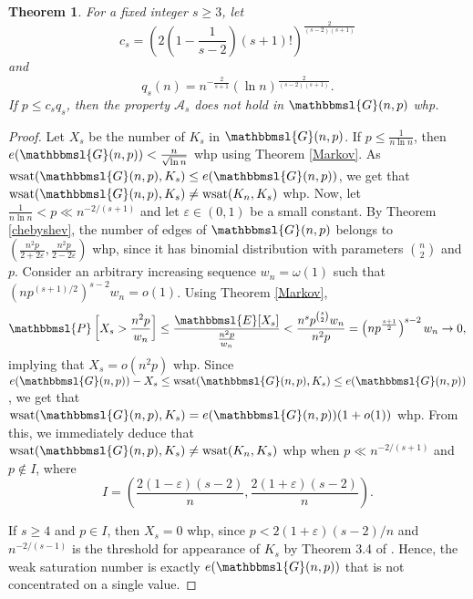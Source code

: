\documentclass[hidelinks, 11pt]{article}
\theoremstyle{plain}
\newtheorem{theorem}{Theorem}[section]
\theoremstyle{definition}
\begin{document}
\begin{theorem}\label{lower-ii}
For a  fixed integer  $s\geq 3$,  let
$$c_s=\left(2\left(1-\frac{1}{s-2}\right)(s+1)!\right)^{\frac{2}{(s-2)(s+1)}}$$  and $$q_s(n)=n^{-\frac2{s+1}}(\ln n)^\frac{2}{(s-2)(s+1)}.$$
If $p\leq c_sq_s$, then   the property   $\mathcal{A}_s$ does not hold in $\mathbbmsl{G}(n, p)$ whp.
\end{theorem}



\begin{proof}
Let $X_s$ be the number of $K_s$  in $\mathbbmsl{G}(n,p)$.
If $p\leq\frac{1}{n\ln n}$, then    $e(\mathbbmsl{G}(n, p))<\frac{n}{\sqrt{\ln n}}$  whp  using  Theorem \ref{Markov}.  As  $\mathrm{wsat}(\mathbbmsl{G}(n, p), K_s)\leq e(\mathbbmsl{G}(n, p))$, we get that $\mathrm{wsat}(\mathbbmsl{G}(n, p), K_s)\neq\mathrm{wsat}(K_n, K_s)$ whp.
Now, let $\frac{1}{n\ln n}<p\ll n^{-2/(s+1)}$ and let $\varepsilon\in(0, 1)$ be a small constant. By Theorem \ref{chebyshev}, the number of edges of $\mathbbmsl{G}(n,p)$ belongs to $(\tfrac{n^2p}{2+2\varepsilon}, \tfrac{n^2p}{2-2\varepsilon})$  whp,   since it has binomial distribution with parameters ${n\choose 2}$ and $p$. Consider an arbitrary increasing sequence $w_n=\omega(1)$ such that $(np^{(s+1)/2})^{s-2}w_n=o(1)$. Using  Theorem \ref{Markov},
$$\mathbbmsl{P}\left[X_s>\frac{n^2p}{w_n}\right]\leq\frac{\mathbbmsl{E}[X_s]}{\frac{n^2p}{w_n}}<\frac{n^sp^{s\choose 2}w_n}{n^2p}=\left(np^{\frac{s+1}{2}}\right)^{s-2}w_n\to0,$$
implying that $X_s=o(n^2p)$ whp. Since $e(\mathbbmsl{G}(n, p))-X_s\leq\mathrm{wsat}(\mathbbmsl{G}(n, p), K_s)\leq e(\mathbbmsl{G}(n, p))$, we get   that  $\mathrm{wsat}(\mathbbmsl{G}(n, p), K_s)=e(\mathbbmsl{G}(n, p))(1+o(1))$ whp. From this, we immediately deduce that   $\mathrm{wsat}(\mathbbmsl{G}(n, p), K_s)\neq\mathrm{wsat}(K_n, K_s)$ whp when  $p\ll n^{-2/(s+1)}$ and  $p\notin I$, where $$I=\left(\frac{2(1-\varepsilon)(s-2)}{n}, \frac{2(1+\varepsilon)(s-2)}{n}\right).$$


If  $s\geq4$ and $p\in I$, then  $X_s=0$ whp, since $p<2(1+\varepsilon)(s-2)/n$ and $n^{-2/(s-1)}$ is the threshold for appearance of $K_s$   by  Theorem 3.4 of   \cite{RG}. Hence,    the weak saturation number is exactly $e(\mathbbmsl{G}(n, p))$ that is not concentrated on a single value.



\end{proof}
\end{document}
